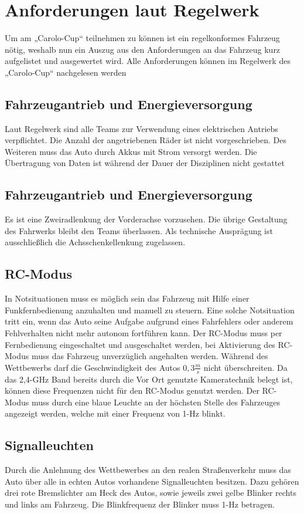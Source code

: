 \section{Anforderungen laut Regelwerk}
Um am „Carolo-Cup“ teilnehmen zu können ist ein regelkonformes Fahrzeug nötig, weshalb nun ein Auszug aus den Anforderungen an das Fahrzeug kurz 
aufgelistet und ausgewertet wird.
Alle Anforderungen können im Regelwerk des „Carolo-Cup“ nachgelesen werden \cite{website-carolo-cup-regelwerk}


\subsection{Fahrzeugantrieb und Energieversorgung}
Laut Regelwerk sind alle Teams zur Verwendung eines elektrischen Antriebs verpflichtet.
Die Anzahl der angetriebenen Räder ist nicht vorgeschrieben.
Des Weiteren muss das Auto durch Akkus mit Strom versorgt werden.
Die Übertragung von Daten ist während der Dauer der Disziplinen nicht gestattet

\subsection{Fahrzeugantrieb und Energieversorgung}
Es ist eine Zweiradlenkung der Vorderachse vorzusehen. Die übrige Gestaltung des Fahrwerks bleibt den Teams überlassen. Als
technische Ausprägung ist ausschließlich die Achsschenkellenkung zugelassen.

\subsection{RC-Modus}
In Notsituationen muss es möglich sein das Fahrzeug mit Hilfe einer Funkfernbedienung anzuhalten und manuell zu steuern. Eine solche Notsituation tritt ein, wenn
das Auto seine Aufgabe aufgrund eines Fahrfehlers oder anderem Fehlverhalten nicht mehr autonom fortführen kann.
Der RC-Modus muss per Fernbedienung eingeschaltet und ausgeschaltet werden, bei Aktivierung des RC-Modus muss das Fahrzeug unverzüglich angehalten werden.
Während des Wettbewerbs darf die Geschwindigkeit des Autos $0,3\frac{m}{s}$ nicht überschreiten.
Da das 2,4-GHz Band bereits durch die Vor Ort genutzte Kameratechnik belegt ist, können diese Frequenzen nicht für den RC-Modus genutzt werden.
Der RC-Modus muss durch eine blaue Leuchte an der höchsten Stelle des Fahrzeuges angezeigt werden, welche mit einer Frequenz von 1-Hz blinkt.

\subsection{Signalleuchten}
Durch die Anlehnung des Wettbewerbes an den realen Straßenverkehr muss das Auto über alle in echten Autos vorhandene Signalleuchten besitzen. 
Dazu gehören drei rote Bremslichter am Heck des Autos, sowie jeweils zwei gelbe Blinker rechts und links am Fahrzeug. Die Blinkfrequenz der Blinker muss
1-Hz betragen.

